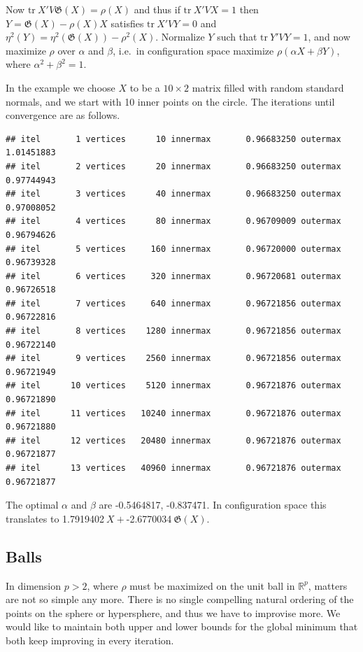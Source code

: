 \documentclass[
  12pt,
]{book}
\theoremstyle{definition}
\theoremstyle{definition}
\theoremstyle{definition}
\theoremstyle{definition}
\theoremstyle{remark}
\begin{document}
Now \(\text{tr}\ X'V\mathfrak{G}(X)=\rho(X)\) and thus if \(\text{tr}\ X'VX=1\)
then \(Y=\mathfrak{G}(X)-\rho(X)X\) satisfies \(\text{tr}\ X'VY=0\) and
\(\eta^2(Y)=\eta^2(\mathfrak{G}(X))-\rho^2(X)\). Normalize
\(Y\) such that \(\text{tr}\ Y'VY=1\), and now maximize \(\rho\) over \(\alpha\) and
\(\beta\), i.e.~in configuration space maximize \(\rho(\alpha X+\beta Y)\),
where \(\alpha^2+\beta^2=1\).

In the example we choose \(X\) to be a \(10\times 2\) matrix filled with random standard normals, and we start with 10 inner points on the circle. The iterations until convergence are as follows.

\begin{verbatim}
## itel       1 vertices      10 innermax       0.96683250 outermax       1.01451883 
## itel       2 vertices      20 innermax       0.96683250 outermax       0.97744943 
## itel       3 vertices      40 innermax       0.96683250 outermax       0.97008052 
## itel       4 vertices      80 innermax       0.96709009 outermax       0.96794626 
## itel       5 vertices     160 innermax       0.96720000 outermax       0.96739328 
## itel       6 vertices     320 innermax       0.96720681 outermax       0.96726518 
## itel       7 vertices     640 innermax       0.96721856 outermax       0.96722816 
## itel       8 vertices    1280 innermax       0.96721856 outermax       0.96722140 
## itel       9 vertices    2560 innermax       0.96721856 outermax       0.96721949 
## itel      10 vertices    5120 innermax       0.96721876 outermax       0.96721890 
## itel      11 vertices   10240 innermax       0.96721876 outermax       0.96721880 
## itel      12 vertices   20480 innermax       0.96721876 outermax       0.96721877 
## itel      13 vertices   40960 innermax       0.96721876 outermax       0.96721877
\end{verbatim}

The optimal \(\alpha\) and \(\beta\) are -0.5464817, -0.837471. In configuration space this translates to
1.7919402\(\ X+\)-2.6770034\(\ \mathfrak{G}(X)\).

\hypertarget{balls}{%
\subsection{Balls}\label{balls}}

In dimension \(p>2\), where \(\rho\) must be maximized on the unit ball in \(\mathbb{R}^p\), matters are not so simple any more. There is no single compelling natural ordering of the points on the sphere or hypersphere, and thus we have to improvise more.
We would like to maintain both upper and lower bounds for the global minimum that both keep improving in every iteration.
\end{document}
